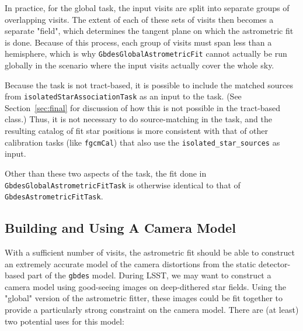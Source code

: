 \documentclass[DM,authoryear,toc]{lsstdoc}
\begin{document}
In practice, for the global task, the input visits are split into separate groups of overlapping visits. The extent of each of these sets of visits then becomes a separate "field", which determines the tangent plane on which the astrometric fit is done. Because of this process, each group of visits must span less than a hemisphere, which is why \texttt{GbdesGlobalAstrometricFit} cannot actually be run globally in the scenario where the input visits actually cover the whole sky.

Because the task is not tract-based, it is possible to include the matched sources from \texttt{isolatedStarAssociationTask} as an input to the task. (See Section~\ref{sec:final} for discussion of how this is not possible in the tract-based class.) Thus, it is not necessary to do source-matching in the task, and the resulting catalog of fit star positions is more consistent with that of other calibration tasks (like \texttt{fgcmCal}) that also use the \texttt{isolated\_star\_sources} as input.

Other than these two aspects of the task, the fit done in \texttt{GbdesGlobalAstrometricFitTask} is otherwise identical to that of \texttt{GbdesAstrometricFitTask}.

 \subsection{Building and Using A Camera Model}\label{sec:DetMod}
With a sufficient number of visits, the astrometric fit should be able to construct an extremely accurate model of the camera distortions from the static detector-based part of the \texttt{gbdes} model. During LSST, we may want to construct a camera model using good-seeing images on deep-dithered star fields. Using the "global" version of the astrometric fitter, these images could be fit together to provide a particularly strong constraint on the camera model. There are (at least) two potential uses for this model:
\end{document}
